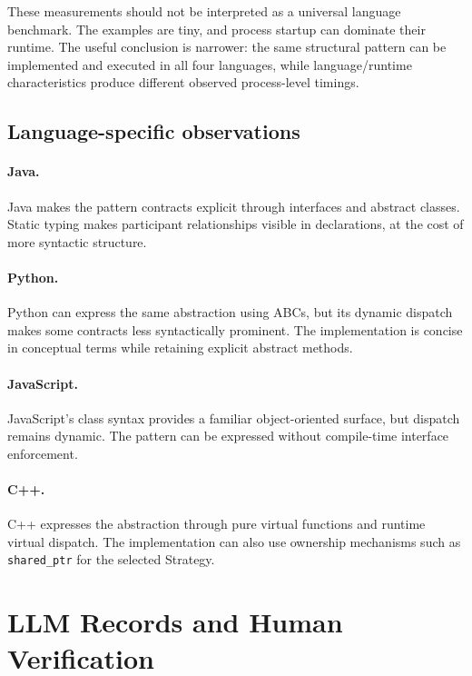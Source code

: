 \documentclass[10pt,a4paper]{article}
\newcommand{\code}[1]{\texttt{\small #1}}
\begin{document}
These measurements should not be interpreted as a universal language benchmark. The examples are tiny, and process startup can dominate their runtime. The useful conclusion is narrower: the same structural pattern can be implemented and executed in all four languages, while language/runtime characteristics produce different observed process-level timings.

\subsection{Language-specific observations}

\paragraph{Java.}
Java makes the pattern contracts explicit through interfaces and abstract classes. Static typing makes participant relationships visible in declarations, at the cost of more syntactic structure.

\paragraph{Python.}
Python can express the same abstraction using ABCs, but its dynamic dispatch makes some contracts less syntactically prominent. The implementation is concise in conceptual terms while retaining explicit abstract methods.

\paragraph{JavaScript.}
JavaScript's class syntax provides a familiar object-oriented surface, but dispatch remains dynamic. The pattern can be expressed without compile-time interface enforcement.

\paragraph{C++.}
C++ expresses the abstraction through pure virtual functions and runtime virtual dispatch. The implementation can also use ownership mechanisms such as \code{shared\_ptr} for the selected Strategy.

\section{LLM Records and Human Verification}
\end{document}
